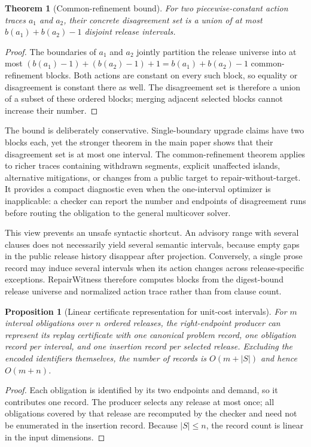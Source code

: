 \documentclass[10pt,conference]{IEEEtran}
\newtheorem{theorem}{Theorem}
\newtheorem{proposition}{Proposition}
\begin{document}
\begin{theorem}[Common-refinement bound]
For two piecewise-constant action traces $a_1$ and $a_2$, their concrete disagreement set is a union of at most $b(a_1)+b(a_2)-1$ disjoint release intervals.
\end{theorem}
\begin{proof}
The boundaries of $a_1$ and $a_2$ jointly partition the release universe into at most $(b(a_1)-1)+(b(a_2)-1)+1=b(a_1)+b(a_2)-1$ common-refinement blocks. Both actions are constant on every such block, so equality or disagreement is constant there as well. The disagreement set is therefore a union of a subset of these ordered blocks; merging adjacent selected blocks cannot increase their number.
\end{proof}

The bound is deliberately conservative. Single-boundary upgrade claims have two blocks each, yet the stronger theorem in the main paper shows that their disagreement set is at most one interval. The common-refinement theorem applies to richer traces containing withdrawn segments, explicit unaffected islands, alternative mitigations, or changes from a public target to repair-without-target. It provides a compact diagnostic even when the one-interval optimizer is inapplicable: a checker can report the number and endpoints of disagreement runs before routing the obligation to the general multicover solver.

This view prevents an unsafe syntactic shortcut. An advisory range with several clauses does not necessarily yield several semantic intervals, because empty gaps in the public release history disappear after projection. Conversely, a single prose record may induce several intervals when its action changes across release-specific exceptions. RepairWitness therefore computes blocks from the digest-bound release universe and normalized action trace rather than from clause count.

\begin{proposition}[Linear certificate representation for unit-cost intervals]
For $m$ interval obligations over $n$ ordered releases, the right-endpoint producer can represent its replay certificate with one canonical problem record, one obligation record per interval, and one insertion record per selected release. Excluding the encoded identifiers themselves, the number of records is $O(m+|S|)$ and hence $O(m+n)$.
\end{proposition}
\begin{proof}
Each obligation is identified by its two endpoints and demand, so it contributes one record. The producer selects any release at most once; all obligations covered by that release are recomputed by the checker and need not be enumerated in the insertion record. Because $|S|\leq n$, the record count is linear in the input dimensions.
\end{proof}
\end{document}
